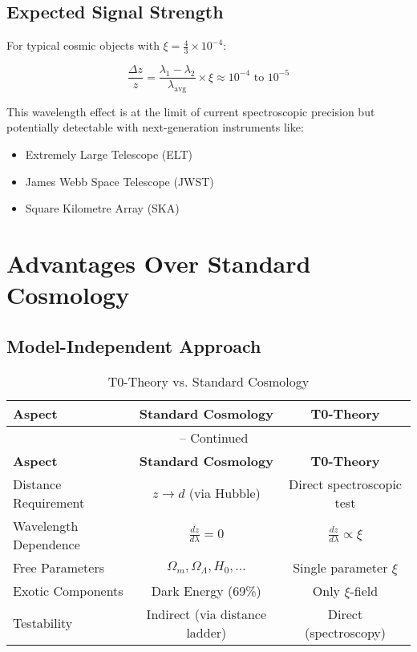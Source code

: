 \documentclass[12pt,a4paper]{article}
\newcommand{\xiconst}{\xi = \frac{4}{3} \times 10^{-4}}
\theoremstyle{definition}
\begin{document}
	\subsection{Expected Signal Strength}
	
	For typical cosmic objects with $\xiconst$:
	
	\begin{equation}
		\frac{\Delta z}{z} = \frac{\lambda_1 - \lambda_2}{\lambda_{\text{avg}}} \times \xi \approx 10^{-4} \text{ to } 10^{-5}
	\end{equation}
	
	\begin{important}
		This wavelength effect is at the limit of current spectroscopic precision but potentially detectable with next-generation instruments like:
		\begin{itemize}
			\item Extremely Large Telescope (ELT)
			\item James Webb Space Telescope (JWST)
			\item Square Kilometre Array (SKA)
		\end{itemize}
	\end{important}
	
	\section{Advantages Over Standard Cosmology}
	
	\subsection{Model-Independent Approach}
	
	\begin{longtable}{lcc}
		\caption{T0-Theory vs. Standard Cosmology} \\
		\toprule
		\textbf{Aspect} & \textbf{Standard Cosmology} & \textbf{T0-Theory} \\
		\midrule
		\endfirsthead
		\multicolumn{3}{c}{\tablename\ \thetable{} -- Continued} \\
		\toprule
		\textbf{Aspect} & \textbf{Standard Cosmology} & \textbf{T0-Theory} \\
		\midrule
		\endhead
		Distance Requirement & $z \rightarrow d$ (via Hubble) & Direct spectroscopic test \\
		Wavelength Dependence & $\frac{dz}{d\lambda} = 0$ & $\frac{dz}{d\lambda} \propto \xi$ \\
		Free Parameters & $\Omega_m, \Omega_\Lambda, H_0, \ldots$ & Single parameter $\xi$ \\
		Exotic Components & Dark Energy (69\%) & Only $\xi$-field \\
		Testability & Indirect (via distance ladder) & Direct (spectroscopy) \\
		\bottomrule
	\end{longtable}
	
\end{document}
